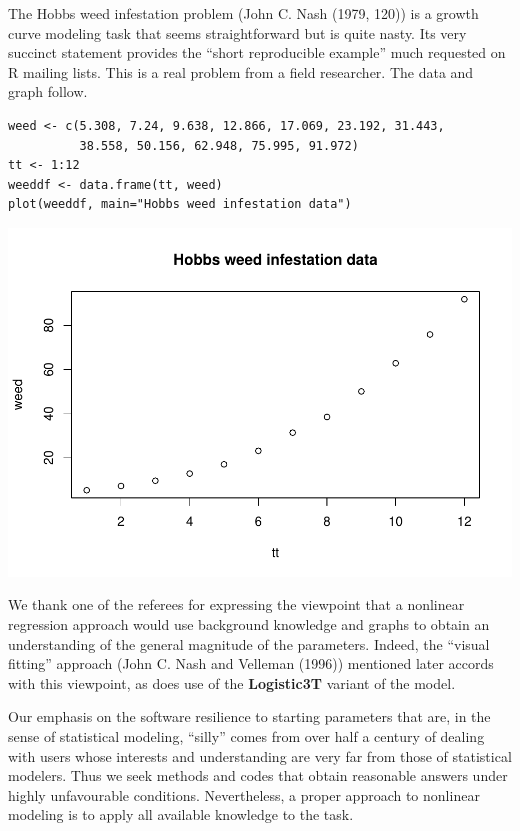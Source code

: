 The Hobbs weed infestation problem (John C. Nash (1979, 120)) is a growth curve modeling
task that seems straightforward but is quite nasty. Its very succinct statement
provides the ``short reproducible example'' much requested on R mailing lists.
This is a real problem from a field researcher. The data and graph follow.

\begin{verbatim}
weed <- c(5.308, 7.24, 9.638, 12.866, 17.069, 23.192, 31.443,
          38.558, 50.156, 62.948, 75.995, 91.972)
tt <- 1:12
weeddf <- data.frame(tt, weed)
plot(weeddf, main="Hobbs weed infestation data")
\end{verbatim}

\includegraphics{ComparingNLStools_files/figure-latex/ex01-1.pdf}

We thank one of the referees for expressing the viewpoint that a nonlinear regression
approach would use background knowledge and graphs to obtain an understanding of
the general magnitude of the parameters. Indeed, the ``visual fitting'' approach
(John C. Nash and Velleman (1996)) mentioned later accords with this viewpoint, as does use
of the \textbf{Logistic3T} variant of the model.

Our emphasis on the software resilience to starting parameters that are, in the
sense of statistical modeling, ``silly'' comes from over half a century of dealing
with users whose interests and understanding are very far from those of statistical
modelers. Thus we seek methods and codes that obtain reasonable answers under
highly unfavourable conditions. Nevertheless, a proper approach to
nonlinear modeling is to apply all available knowledge to the task.

